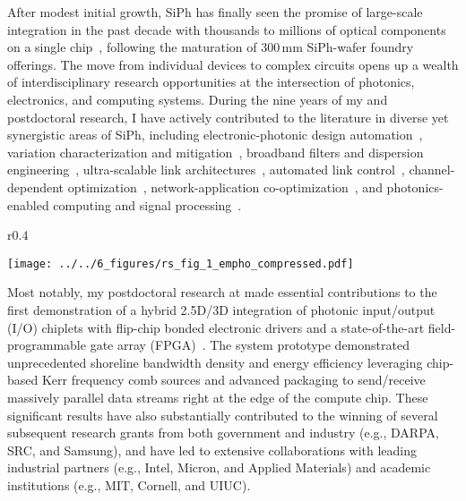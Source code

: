 After modest initial growth, SiPh has finally seen the promise of large-scale integration in the past decade with thousands to millions of optical components on a single chip~\cite{shekharRoadmappingNextGeneration2024}, following the maturation of 300\,mm SiPh-wafer foundry offerings. The move from individual devices to complex circuits opens up a wealth of interdisciplinary research opportunities at the intersection of photonics, electronics, and computing systems. During the nine years of my \myDegree{} and postdoctoral research, I have actively contributed to the literature in diverse yet synergistic areas of SiPh, including electronic-photonic design automation~\cite{wuCompactModelingCircuitlevel2017,zhangCompactModelingSilicon2017,jamesFlexibleProcessAwareCompact2022,jamesProcessVariationAwareCompact2023a}, variation characterization and mitigation~\cite{wuPairingMicroringbasedSilicon2018,wangEnergyefficientChannelAlignment2018,wangTamingEmergingDevices2019,wangBidirectionalTuningMicroringbased2019,wangCharacterizationApplicationsSpatial2020,wangEnergyEfficiencyYield2021}, broadband filters and dispersion engineering~\cite{wangDispersionEngineeredFabricationRobustSOI2023,wangIntegratedCompactTunable2023,parsonsOFC25}, ultra-scalable link architectures~\cite{wangScalableArchitectureSubpJ2023,novickHighbandwidthDensitySilicon2023}, automated link control~\cite{wangAutomatedTuningRingAssisted2024,wangInterleaverTuning,wangOFC25}, channel-dependent optimization~\cite{novickIntegratedPhotonicResonant2024,gopalEqualization2024}, network-application co-optimization~\cite{wangTaskMappingAssistedLaser2019,wangTrafficAdaptivePowerReconfiguration2021,michelogiannakisEfficientIntraRackResource2023,wuWavelengthReconfigurableTransceiver2024,wuFlexibleSiliconPhotonic2024}, and photonics-enabled computing and signal processing~\cite{naumanOFC25,zypmanDSP}.


\begin{wrapfigure}{r}{0.4\textwidth}
    \begin{center}
        \texttt{[image: ../../6\_figures/rs\_fig\_1\_empho\_compressed.pdf]}
    \end{center}
    \caption{}
\end{wrapfigure}

Most notably, my postdoctoral research at \mySchoolShort{} made essential contributions to the first demonstration of a hybrid 2.5D/3D integration of photonic input/output (I/O) chiplets with
flip-chip bonded electronic drivers and a state-of-the-art field-programmable gate array (FPGA)~\cite{wangSiliconPhotonicsChip2024,wangCoDesignedSiliconPhotonics2024,RovinskiISCAS25}. The system prototype demonstrated unprecedented shoreline bandwidth density and energy efficiency leveraging chip-based Kerr frequency comb sources and advanced packaging to send/receive massively parallel data streams right at the edge of the compute chip. These significant results have also substantially contributed to the winning of several subsequent research grants from both government and industry (e.g., DARPA, SRC, and Samsung), and have led to extensive collaborations with leading industrial partners (e.g., Intel, Micron, and Applied Materials) and academic institutions (e.g., MIT, Cornell, and UIUC).

